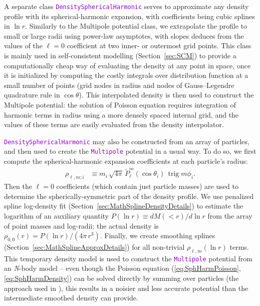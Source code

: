 \documentclass[12pt]{article}
\newcommand{\Nbody}{\textsl{N}-body\xspace}
\newcommand{\ttt}[1]{\textcolor{darkviolet}{\texttt{#1}}}
\DeclareMathOperator{\trig}{trig}
\begin{document}
A separate class \ttt{DensitySphericalHarmonic} serves to approximate any density profile with its spherical-harmonic expansion, with coefficients being cubic splines in $\ln r$. 
Similarly to the Multipole potential class, we extrapolate the profile to small or large radii using power-law asymptotes, with slopes deduces from the values of the $\ell=0$ coefficient at two inner- or outermost grid points. This class is mainly used in self-consistent modelling (Section~\ref{sec:SCM}) to provide a computationally cheap way of evaluating the density at any point in space, once it is initialized by computing the costly integrals over distribution function at a small number of points (grid nodes in radius and nodes of Gauss--Legendre quadrature rule in $\cos\theta$). This interpolated density is then used to construct the Multipole potential: the solution of Poisson equation requires integration of harmonic terms in radius using a more densely spaced internal grid, and the values of these terms are easily evaluated from the density interpolator. %

\ttt{DensitySphericalHarmonic} may also be constructed from an array of particles, and then used to create the \ttt{Multipole} potential in a usual way. To do so, we first compute the spherical-harmonic expansion coefficients at each particle's radius:
\begin{align*}
\rho_{\ell,m;i} &\equiv m_i\,\sqrt{4\pi}\,\tilde P_\ell^m(\cos\theta_i)\,\trig m\phi_i .
\end{align*}
Then the $\ell=0$ coefficients (which contain just particle masses) are used to determine the spherically-symmetric part of the density profile. We use penalized spline log-density fit (Section~\ref{sec:MathSplineDensityDetails}) to estimate the logarithm of an auxiliary quantity $P(\ln r) \equiv dM(<r)/d\ln r$ from the array of point masses and log-radii; the actual density is $\rho_{0,0}(r) = P(\ln r) / (4\pi\,r^3)$. Finally, we create smoothing splines (Section~\ref{sec:MathSplineApproxDetails}) for all non-trivial $\rho_{\ell,m}(\ln r)$ terms.
This temporary density model is used to construct the \ttt{Multipole} potential from an \Nbody model -- even though the Poisson equation (\ref{eq:SphHarmPoisson},\ref{eq:SphHarmDensity}) can be solved directly by summing over particles (the approach used in \cite{Vasiliev2013}), this results in a noisier and less accurate potential than the intermediate smoothed density can provide.
\end{document}
